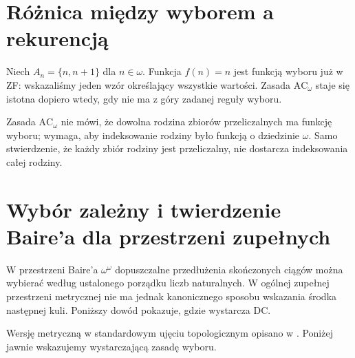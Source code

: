 \section{Różnica między wyborem a rekurencją}
\begin{przyklad}
Niech $A_n=\{n,n+1\}$ dla $n\in\omega$. Funkcja $f(n)=n$ jest funkcją wyboru już w ZF: wskazaliśmy jeden wzór określający wszystkie wartości. Zasada $\mathrm{AC}_\omega$ staje się istotna dopiero wtedy, gdy nie ma z góry zadanej reguły wyboru.
\end{przyklad}
\begin{uwaga}
Zasada $\mathrm{AC}_\omega$ nie mówi, że dowolna rodzina zbiorów przeliczalnych ma funkcję wyboru; wymaga, aby indeksowanie rodziny było funkcją o dziedzinie $\omega$. Samo stwierdzenie, że każdy zbiór rodziny jest przeliczalny, nie dostarcza indeksowania całej rodziny.
\end{uwaga}


\section{Wybór zależny i twierdzenie Baire'a dla przestrzeni zupełnych}
\label{sec:weak-choice-baire}
W przestrzeni Baire'a $\omega^\omega$ dopuszczalne
przedłużenia skończonych ciągów można wybierać
według ustalonego porządku liczb naturalnych.
W ogólnej zupełnej przestrzeni metrycznej nie ma jednak
kanonicznego sposobu wskazania środka następnej kuli.
Poniższy dowód pokazuje, gdzie wystarcza $\mathrm{DC}$.

Wersję metryczną w standardowym ujęciu topologicznym opisano w . Poniżej jawnie wskazujemy wystarczającą zasadę wyboru.

